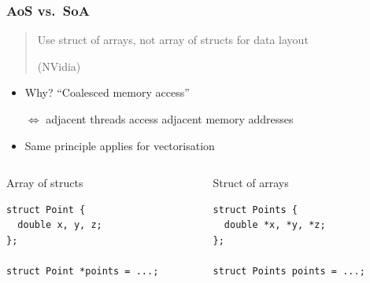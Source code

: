 \documentclass[presentation,aspectratio=43,10pt]{beamer}
\begin{document}
\begin{frame}[fragile]
  \frametitle{AoS vs.~SoA}
  \begin{quote}
    Use struct of arrays, not array of structs for data layout

    (NVidia)
  \end{quote}
  \begin{itemize}
  \item Why? ``Coalesced memory access''
  \item[$\Leftrightarrow$] adjacent threads access adjacent memory
    addresses
  \item Same principle applies for vectorisation
  \end{itemize}

  \begin{columns}
    \begin{column}{0.5\textwidth}
      Array of structs
      
\begin{verbatim}
struct Point {
  double x, y, z;
};

struct Point *points = ...;
\end{verbatim}
    \end{column}

    \begin{column}{0.5\textwidth}
      Struct of arrays

\begin{verbatim}
struct Points {
  double *x, *y, *z;
};

struct Points points = ...;
\end{verbatim}
    \end{column}
  \end{columns}
\end{frame}
\end{document}
